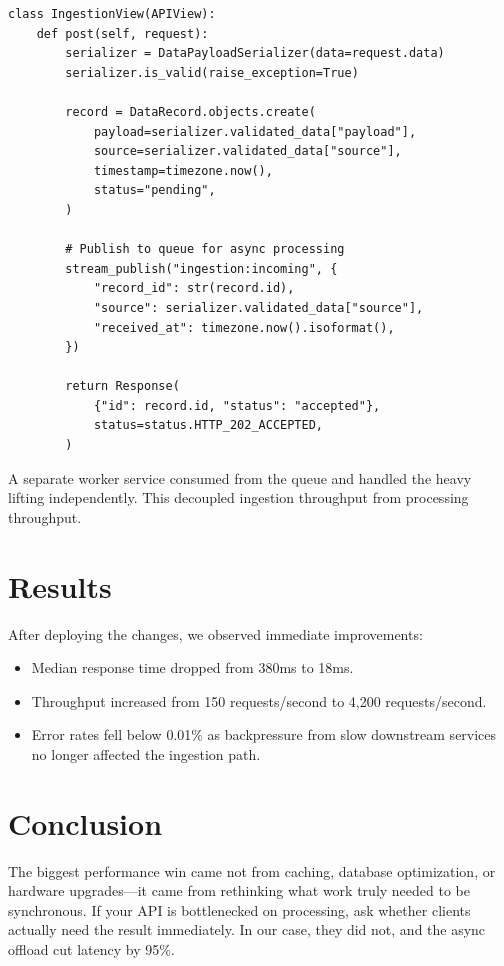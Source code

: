 \documentclass[
    language=english,
    doctype=blog-post,
    institution=none,
]{../../omnilatex}
\begin{document}
\begin{lstlisting}[caption={Refactored endpoint with async processing}]
class IngestionView(APIView):
    def post(self, request):
        serializer = DataPayloadSerializer(data=request.data)
        serializer.is_valid(raise_exception=True)

        record = DataRecord.objects.create(
            payload=serializer.validated_data["payload"],
            source=serializer.validated_data["source"],
            timestamp=timezone.now(),
            status="pending",
        )

        # Publish to queue for async processing
        stream_publish("ingestion:incoming", {
            "record_id": str(record.id),
            "source": serializer.validated_data["source"],
            "received_at": timezone.now().isoformat(),
        })

        return Response(
            {"id": record.id, "status": "accepted"},
            status=status.HTTP_202_ACCEPTED,
        )
\end{lstlisting}

A separate worker service consumed from the queue and handled the heavy lifting
independently. This decoupled ingestion throughput from processing throughput.

\section{Results}

After deploying the changes, we observed immediate improvements:

\begin{itemize}
    \item Median response time dropped from 380ms to 18ms.
    \item Throughput increased from 150 requests/second to 4,200 requests/second.
    \item Error rates fell below 0.01\% as backpressure from slow downstream
          services no longer affected the ingestion path.
\end{itemize}

\section{Conclusion}

The biggest performance win came not from caching, database optimization, or
hardware upgrades---it came from rethinking what work truly needed to be
synchronous. If your API is bottlenecked on processing, ask whether clients
actually need the result immediately. In our case, they did not, and the async
offload cut latency by 95\%.
\end{document}
